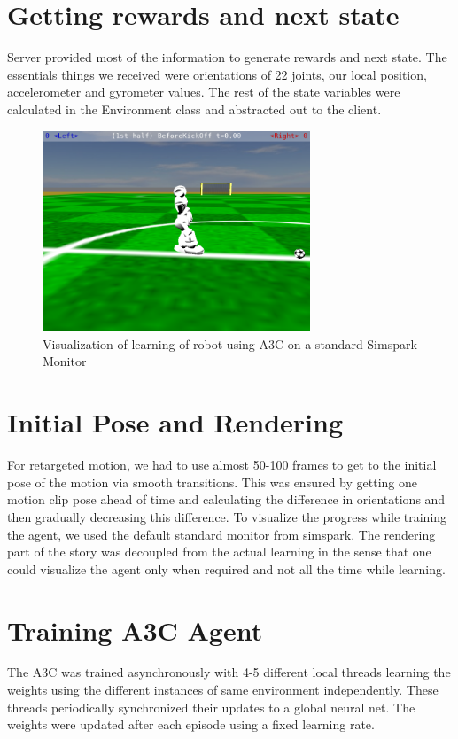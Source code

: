 \section{Getting rewards and next state}
Server provided most of the information to generate rewards and next state. The essentials things we received were orientations of 22 joints, our local position, accelerometer and gyrometer values. The rest of the state variables were calculated in the Environment class and abstracted out to the client.

\begin{figure}
\centering
  \includegraphics[width=0.5\linewidth, height=6cm,keepaspectratio]{images/monitor.png}
  \caption{Visualization of learning of robot using A3C on a standard Simspark Monitor}
  \label{fig:simulator}
\end{figure}

\section{Initial Pose and Rendering}
For retargeted motion, we had to use almost 50-100 frames to get to the initial pose of the motion via smooth transitions. This was ensured by getting one motion clip pose ahead of time and calculating the difference in orientations and then gradually decreasing this difference.
To visualize the progress while training the agent, we used the default standard monitor from simspark. The rendering part of the story was decoupled from the actual learning in the sense that one could visualize the agent only when required and not all the time while learning.

\section{Training A3C Agent}
The A3C \cite{pytorchaaac} was trained asynchronously with 4-5 different local threads learning the weights using the different instances of same environment independently. These threads periodically synchronized their updates to a global neural net. The weights were updated after each episode using a fixed learning rate.  

